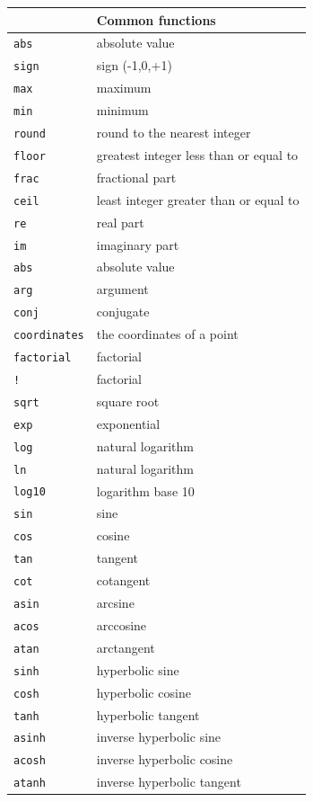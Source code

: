 \documentclass{article}
\begin{document}
\begin{center}
\begin{tabular}{|p{}|p{}|}
\hline
\multicolumn{2}{|c|}{\bf Common functions}\\
\hline\hline
\texttt{abs} & absolute value\\
\texttt{sign} & sign (-1,0,+1)\\
\texttt{max} & maximum\\
\texttt{min} & minimum\\
\texttt{round} & round to the nearest integer \\
\texttt{floor} & greatest integer less than or equal to\\
\texttt{frac} & fractional part\\
\texttt{ceil} & least integer greater than or equal to\\
\hline
\texttt{re} & real part\\
\texttt{im} & imaginary part\\
\texttt{abs} & absolute value\\
\texttt{arg} & argument\\
\texttt{conj} & conjugate\\
\texttt{coordinates} & the coordinates of a point\\
\hline
\texttt{factorial} & factorial\\
\texttt{!} & factorial\\
\texttt{sqrt} & square root\\
\texttt{exp} & exponential\\
\texttt{log} & natural logarithm\\
\texttt{ln} & natural logarithm\\
\texttt{log10} & logarithm base 10\\
\hline
\texttt{sin} & sine\\
\texttt{cos} & cosine\\
\texttt{tan} & tangent\\
\texttt{cot} & cotangent\\
\texttt{asin} & arcsine\\
\texttt{acos} & arccosine\\
\texttt{atan} & arctangent\\
\hline
\texttt{sinh} & hyperbolic sine\\
\texttt{cosh} & hyperbolic cosine\\
\texttt{tanh} & hyperbolic tangent\\
\texttt{asinh} & inverse hyperbolic sine\\
\texttt{acosh} & inverse hyperbolic cosine\\
\texttt{atanh} & inverse hyperbolic tangent\\
\hline
\end{tabular}
\end{center}
\end{document}
